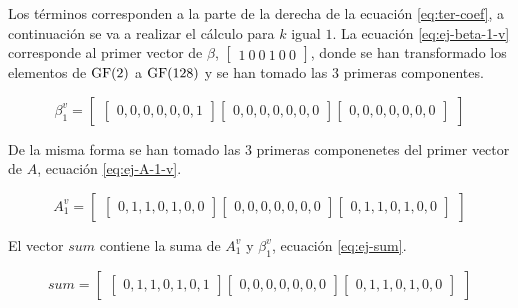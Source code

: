 Los términos corresponden a la parte de la derecha de la ecuación \ref{eq:ter-coef}, a continuación se va a realizar el cálculo para $k$ igual $1$. La ecuación \ref{eq:ej-beta-1-v} corresponde al primer vector de $\beta$, $\left[\begin{array}{c}1\ 0\ 0\ 1\ 0\ 0\end{array}\right]$, donde se han transformado los elementos de $\operatorname{GF}(2)$ a $\operatorname{GF}(128)$ y se han tomado las $3$ primeras componentes.

\begin{equation}\label{eq:ej-beta-1-v}
	{\beta^v_1} = 
		\left[\begin{array}{c}
			\left[\begin{array}{c}0, 0, 0, 0, 0, 0, 1\end{array}\right]			
			\left[\begin{array}{c}0, 0, 0, 0, 0, 0, 0\end{array}\right]
			\left[\begin{array}{c}0, 0, 0, 0, 0, 0, 0\end{array}\right]
		\end{array}\right]
\end{equation}

De la misma forma se han tomado las $3$ primeras componenetes del primer vector de $A$, ecuación \ref{eq:ej-A-1-v}.

\begin{equation}\label{eq:ej-A-1-v}
	{A^v_1} = 
		\left[\begin{array}{c}
			\left[\begin{array}{c}0, 1, 1, 0, 1, 0, 0\end{array}\right]			
			\left[\begin{array}{c}0, 0, 0, 0, 0, 0, 0\end{array}\right]
			\left[\begin{array}{c}0, 1, 1, 0, 1, 0, 0\end{array}\right]
		\end{array}\right]
\end{equation}

El vector $sum$ contiene la suma de $A^v_1$ y $\beta^v_1$, ecuación \ref{eq:ej-sum}.

\begin{equation}\label{eq:ej-sum}
	{sum} = 
		\left[\begin{array}{c}
			\left[\begin{array}{c}0, 1, 1, 0, 1, 0, 1\end{array}\right]			
			\left[\begin{array}{c}0, 0, 0, 0, 0, 0, 0\end{array}\right]
			\left[\begin{array}{c}0, 1, 1, 0, 1, 0, 0\end{array}\right]
		\end{array}\right]
\end{equation}

